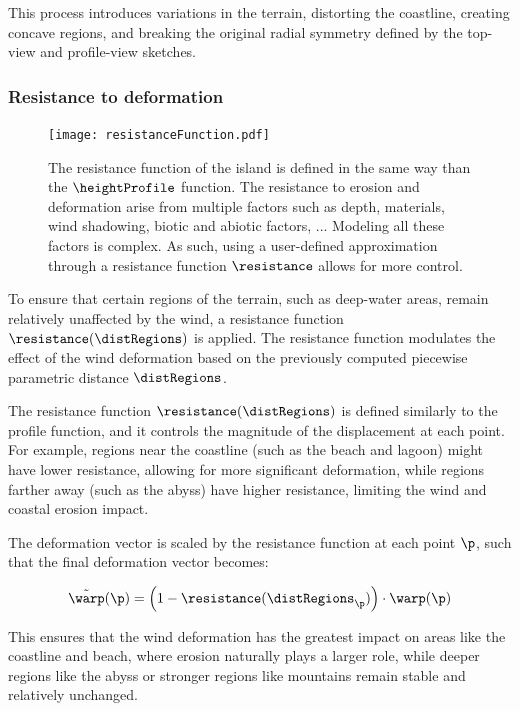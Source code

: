 This process introduces variations in the terrain, distorting the coastline, creating concave regions, and breaking the original radial symmetry defined by the top-view and profile-view sketches.

\subsubsection{Resistance to deformation}

\begin{figure}[H]
	\centering
	\texttt{[image: resistanceFunction.pdf]}
    \caption{The resistance function of the island is defined in the same way than the $\heightProfile$ function. The resistance to erosion and deformation arise from multiple factors such as depth, materials, wind shadowing, biotic and abiotic factors, ... Modeling all these factors is complex. As such, using a user-defined approximation through a resistance function $\resistance$ allows for more control. }
    \label{fig:coral-island-resistance-function}
\end{figure}

To ensure that certain regions of the terrain, such as deep-water areas, remain relatively unaffected by the wind, a resistance function $\resistance(\distRegions)$ is applied. The resistance function modulates the effect of the wind deformation based on the previously computed piecewise parametric distance $\distRegions$.

The resistance function $\resistance(\distRegions)$ is defined similarly to the profile function, and it controls the magnitude of the displacement at each point. For example, regions near the coastline (such as the beach and lagoon) might have lower resistance, allowing for more significant deformation, while regions farther away (such as the abyss) have higher resistance, limiting the wind and coastal erosion impact.

The deformation vector is scaled by the resistance function at each point $\p$, such that the final deformation vector becomes:

\begin{align}
    \Tilde{\warp}(\p) = \left(1 - \resistance(\distRegions_\p) \right) \cdot \warp(\p)
\end{align}

This ensures that the wind deformation has the greatest impact on areas like the coastline and beach, where erosion naturally plays a larger role, while deeper regions like the abyss or stronger regions like mountains remain stable and relatively unchanged.

